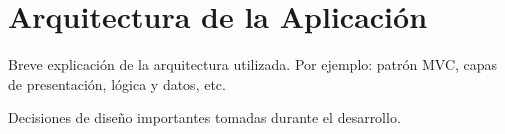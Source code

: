 \section*{Arquitectura de la Aplicación}

Breve explicación de la arquitectura utilizada. Por ejemplo: patrón MVC, capas de presentación, lógica y datos, etc.

Decisiones de diseño importantes tomadas durante el desarrollo.
